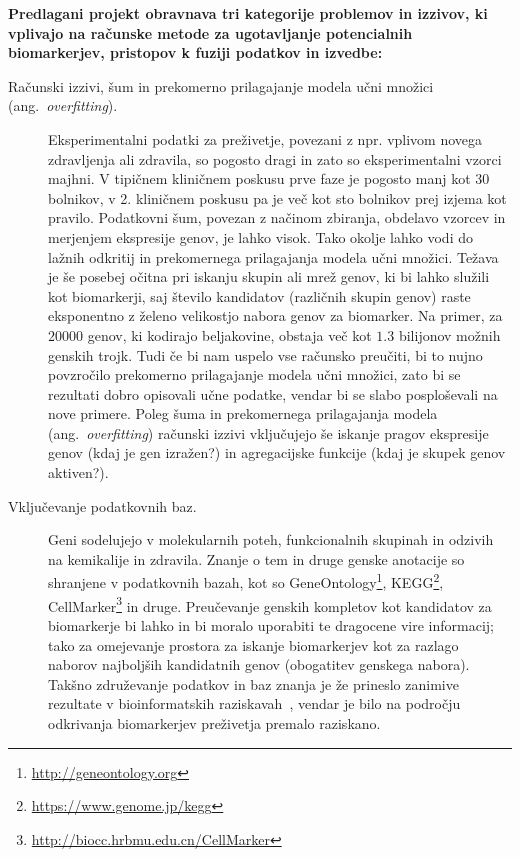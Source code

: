 \documentclass[11pt,a4paper]{article}
\newcommand{\myurl}[1]{\footnote{\url{#1}}}
\renewcommand{\bold}{\textbf}
\begin{document}
\bold{Predlagani projekt obravnava tri kategorije problemov in izzivov, ki vplivajo na
računske metode za ugotavljanje potencialnih biomarkerjev, pristopov k fuziji podatkov in izvedbe:}
\begin{description}
	\item[Računski izzivi, šum in prekomerno prilagajanje modela učni množici (ang.~{\em overfitting}).] Eksperimentalni podatki za preživetje, povezani z npr. vplivom novega zdravljenja ali zdravila, so pogosto dragi in zato so eksperimentalni vzorci majhni. V tipičnem kliničnem poskusu prve faze je pogosto manj kot 30 bolnikov, v 2. kliničnem poskusu pa je več kot sto bolnikov prej izjema kot pravilo. Podatkovni šum, povezan z načinom zbiranja, obdelavo vzorcev in merjenjem ekspresije genov, je lahko visok. Tako okolje lahko vodi do lažnih odkritij in prekomernega prilagajanja modela učni množici. Težava je še posebej očitna pri iskanju skupin ali mrež genov, ki bi lahko služili kot biomarkerji, saj število kandidatov (različnih skupin genov) raste eksponentno z želeno velikostjo nabora genov za biomarker. Na primer, za $20000$ genov, ki kodirajo beljakovine, obstaja več kot  $1.3$ bilijonov možnih genskih trojk. Tudi če bi nam uspelo vse računsko preučiti, bi to nujno povzročilo prekomerno prilagajanje modela učni množici, zato bi se rezultati dobro opisovali učne podatke, vendar bi se slabo posploševali na nove primere. Poleg šuma in prekomernega prilagajanja modela (ang.~{\em overfitting}) računski izzivi vključujejo še iskanje pragov ekspresije genov (kdaj je gen izražen?) in agregacijske funkcije (kdaj je skupek genov aktiven?).
 	\item[Vključevanje podatkovnih baz.] Geni sodelujejo v molekularnih poteh, funkcionalnih skupinah in odzivih na kemikalije in zdravila. Znanje o tem in druge genske anotacije so shranjene v podatkovnih bazah, kot so GeneOntology\myurl{http://geneontology.org}, KEGG\myurl{https://www.genome.jp/kegg}, CellMarker\myurl{http://biocc.hrbmu.edu.cn/CellMarker} in druge. Preučevanje genskih kompletov kot kandidatov za biomarkerje bi lahko in bi moralo uporabiti te dragocene vire informacij; tako za omejevanje prostora za iskanje biomarkerjev kot za razlago naborov najboljših kandidatnih genov (obogatitev genskega nabora). Takšno združevanje podatkov in baz znanja je že prineslo zanimive rezultate v bioinformatskih raziskavah~\cite{pmid30467459,pmid26465776}, vendar je bilo na področju odkrivanja biomarkerjev preživetja premalo raziskano.

\end{description}
\end{document}
